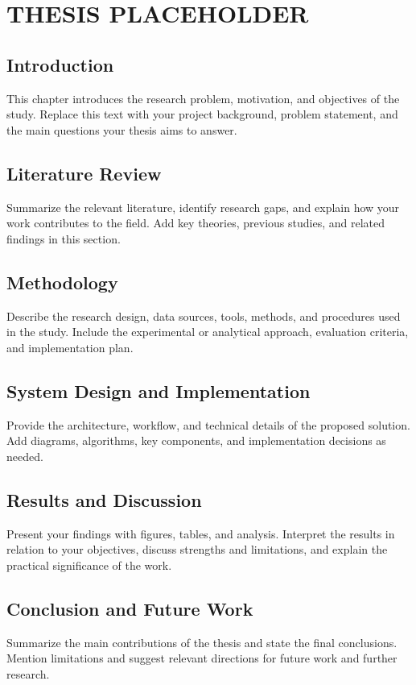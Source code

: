 \chapter{THESIS PLACEHOLDER}

\section{Introduction}
This chapter introduces the research problem, motivation, and objectives of the study. Replace this text with your project background, problem statement, and the main questions your thesis aims to answer.

\section{Literature Review}
Summarize the relevant literature, identify research gaps, and explain how your work contributes to the field. Add key theories, previous studies, and related findings in this section.

\section{Methodology}
Describe the research design, data sources, tools, methods, and procedures used in the study. Include the experimental or analytical approach, evaluation criteria, and implementation plan.

\section{System Design and Implementation}
Provide the architecture, workflow, and technical details of the proposed solution. Add diagrams, algorithms, key components, and implementation decisions as needed.

\section{Results and Discussion}
Present your findings with figures, tables, and analysis. Interpret the results in relation to your objectives, discuss strengths and limitations, and explain the practical significance of the work.

\section{Conclusion and Future Work}
Summarize the main contributions of the thesis and state the final conclusions. Mention limitations and suggest relevant directions for future work and further research.
